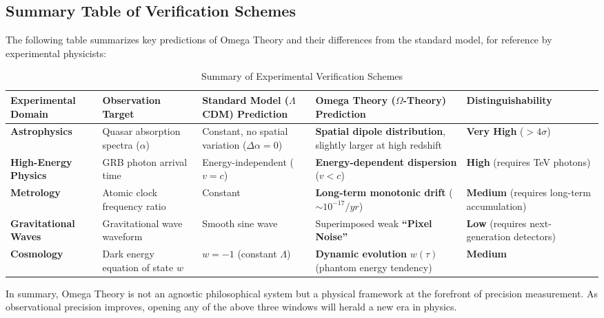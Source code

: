 \subsection{Summary Table of Verification Schemes}

The following table summarizes key predictions of Omega Theory and their differences from the standard model, for reference by experimental physicists:

\begin{table}[ht]
\centering
\small
\begin{tabularx}{\textwidth}{|p{1.8cm}|p{2.2cm}|p{3.5cm}|p{3.5cm}|p{2cm}|}
\hline
\textbf{Experimental Domain} & \textbf{Observation Target} & \textbf{Standard Model ($\Lambda$CDM) Prediction} & \textbf{Omega Theory ($\Omega$-Theory) Prediction} & \textbf{Distinguishability} \\
\hline
\textbf{Astrophysics} & Quasar absorption spectra ($\alpha$) & Constant, no spatial variation ($\Delta \alpha = 0$) & \textbf{Spatial dipole distribution}, slightly larger at high redshift & \textbf{Very High} ($>4\sigma$) \\
\hline
\textbf{High-Energy Physics} & GRB photon arrival time & Energy-independent ($v=c$) & \textbf{Energy-dependent dispersion} ($v < c$) & \textbf{High} (requires TeV photons) \\
\hline
\textbf{Metrology} & Atomic clock frequency ratio & Constant & \textbf{Long-term monotonic drift} ($\sim 10^{-17}/yr$) & \textbf{Medium} (requires long-term accumulation) \\
\hline
\textbf{Gravitational Waves} & Gravitational wave waveform & Smooth sine wave & Superimposed weak \textbf{``Pixel Noise''} & \textbf{Low} (requires next-generation detectors) \\
\hline
\textbf{Cosmology} & Dark energy equation of state $w$ & $w = -1$ (constant $\Lambda$) & \textbf{Dynamic evolution} $w(\tau)$ (phantom energy tendency) & \textbf{Medium} \\
\hline
\end{tabularx}
\caption{Summary of Experimental Verification Schemes}
\end{table}

In summary, Omega Theory is not an agnostic philosophical system but a physical framework at the forefront of precision measurement. As observational precision improves, opening any of the above three windows will herald a new era in physics.

